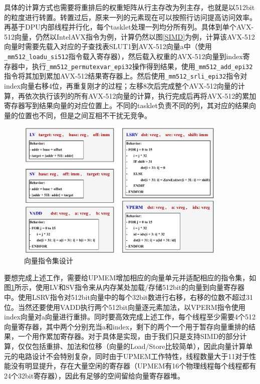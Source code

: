 具体的计算方式也需要将重排后的权重矩阵从行主存改为列主存，也就是以512bit的粒度进行转置。转置过后，原来一列的元素现在可以按照行访问提高访问效率。再基于DPU内部线程并行化，每个tasklet处理一列均分所有列。具体到单个AVX-512向量，仍然以IntelAVX指令为例，计算仍然以图\ref{SIMD}为例，计算该AVX-512向量时需要先载入对应的子查找表SLUT1到AVX-512向量a中（使用\verb|_mm512_loadu_si512|指令载入寄存器），然后载入权重的AVX-512向量到index寄存器中，执行\verb|_mm512_permutexvar_epi32|操作得到结果，使用\verb|_mm512_add_epi32|指令将其加到累加AVX-512结果寄存器上。然后使用\verb|_mm512_srli_epi32|指令对index向量右移4位，再重复刚才的过程；左移8次后完成整个AVX-512向量的计算，再依次执行该列的所有AVX-512向量的计算，执行完成后再将AVX-512的累加寄存器写到结果向量的对应位置上。不同的tasklet负责不同的列，其对应的结果向量的位置也不同，但是之间互相不干扰无竞争。

\begin{figure}[!htbp]
	\centering
    \includegraphics[width=0.9\textwidth]{figures/SIMDInst.pdf}
	\caption{向量指令集设计}
    \label{SIMDInst}
\end{figure}

要想完成上述工作，需要给UPMEM增加相应的向量单元并适配相应的指令集，如图\ref{SIMDInst}所示，使用LV和SV指令来从内存某处加载/存储512bit的向量到向量寄存器中。使用LSRV指令对512bit向量中的每个32bit数进行右移，右移的位数不超过31位。当然还要使用VADD执行两个512bit向量逐元素加法，以VPERM指令使用index向量对a向量进行重排。同时要高效完成上述工作，每个线程至少需要4个512向量寄存器，其中两个分别充当a和index，剩下的两个一个用于暂存向量重排的结果，一个用作累加寄存器。对于具体是实现，由于我们只是支持SIMD的部分计算，仅仅包括重排、加法和位移（向量的Load/Store比较简单），因此向量计算单元的电路设计不会特别复杂，同时由于UPMEM工作特性，线程数量大于11对于性能没有明显提升，存在大量空闲的寄存器（UPMEM有16个物理线程每个线程都有24个32bit寄存器），因此有足够的空间留给向量寄存器堆。


